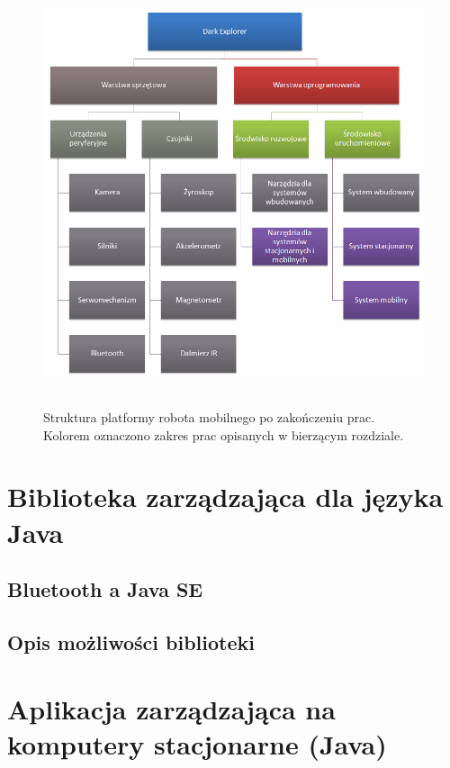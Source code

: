 \begin{figure}[!ht]
 \centering
 \includegraphics[height=125mm]{../images/ch03/dark_explorer_platform_ide_stac_mob.png}
 \caption{Struktura platformy robota mobilnego po zakończeniu prac. Kolorem oznaczono zakres prac opisanych w bierzącym rozdziale.}
 \label{fig:DarkExplorerPlatformStacMob}
\end{figure}

\section{Biblioteka zarządzająca dla języka Java}
\subsection{Bluetooth a Java SE}
\subsection{Opis możliwości biblioteki}
\section{Aplikacja zarządzająca na komputery stacjonarne (Java)}
